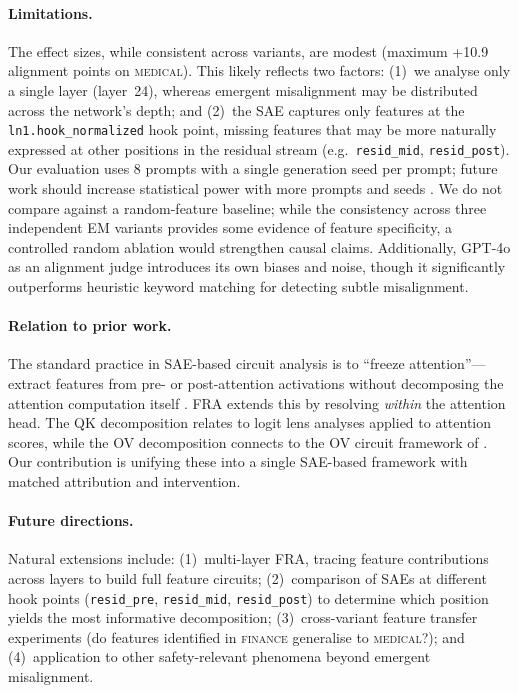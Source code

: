 \documentclass{article}
\theoremstyle{plain}
\theoremstyle{definition}
\theoremstyle{remark}
\begin{document}
\paragraph{Limitations.} The effect sizes, while consistent across variants, are modest (maximum +10.9 alignment points on \textsc{medical}). This likely reflects two factors: (1)~we analyse only a single layer (layer~24), whereas emergent misalignment may be distributed across the network's depth; and (2)~the SAE captures only features at the \texttt{ln1.hook\_normalized} hook point, missing features that may be more naturally expressed at other positions in the residual stream (e.g.\ \texttt{resid\_mid}, \texttt{resid\_post}). Our evaluation uses 8 prompts with a single generation seed per prompt; future work should increase statistical power with more prompts and seeds \citep{emergent_misalignment}. We do not compare against a random-feature baseline; while the consistency across three independent EM variants provides some evidence of feature specificity, a controlled random ablation would strengthen causal claims. Additionally, GPT-4o as an alignment judge introduces its own biases and noise, though it significantly outperforms heuristic keyword matching for detecting subtle misalignment.

\paragraph{Relation to prior work.} The standard practice in SAE-based circuit analysis is to ``freeze attention''---extract features from pre- or post-attention activations without decomposing the attention computation itself \citep{marks2024sparse}. FRA extends this by resolving \emph{within} the attention head. The QK decomposition relates to logit lens analyses \citep{nostalgebraist2020logitlens} applied to attention scores, while the OV decomposition connects to the OV circuit framework of \citet{elhage2021mathematical}. Our contribution is unifying these into a single SAE-based framework with matched attribution and intervention.

\paragraph{Future directions.} Natural extensions include: (1)~multi-layer FRA, tracing feature contributions across layers to build full feature circuits; (2)~comparison of SAEs at different hook points (\texttt{resid\_pre}, \texttt{resid\_mid}, \texttt{resid\_post}) to determine which position yields the most informative decomposition; (3)~cross-variant feature transfer experiments (do features identified in \textsc{finance} generalise to \textsc{medical}?); and (4)~application to other safety-relevant phenomena beyond emergent misalignment.
\end{document}
